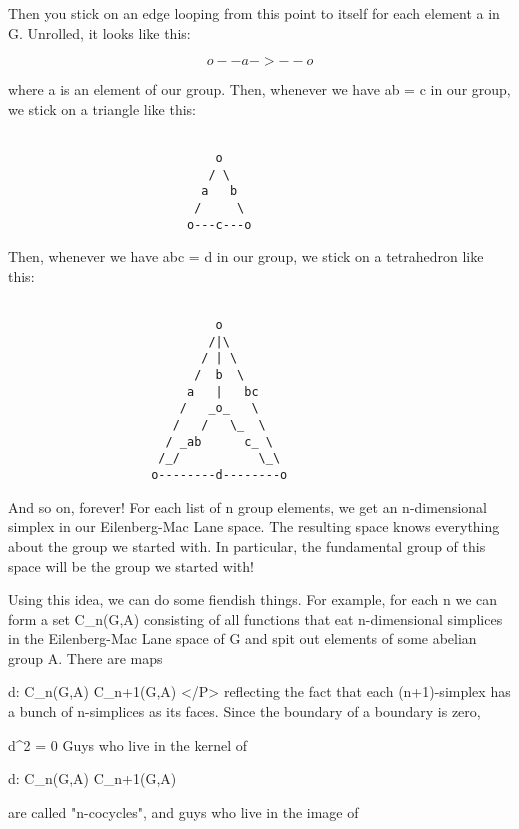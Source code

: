 Then you stick on an edge looping from this point to itself for
each element a in G.   Unrolled, it looks like this: 


$$

                         o--a->--o
$$
    
where a is an element of our group.  Then, whenever we have ab = c in 
our group, we stick on a triangle like this:


\begin{verbatim}

                             o
                            / \
                           a   b
                          /     \
                         o---c---o
\end{verbatim}
    
Then, whenever we have abc = d in our group, we stick on a tetrahedron 
like this:


\begin{verbatim}

                             o                      
                            /|\                    
                           / | \                  
                          /  b  \                
                         a   |   bc             
                        /   _o_   \  
                       /   /   \_  \          
                      / _ab      c_ \        
                     /_/           \_\      
                    o--------d--------o
\end{verbatim}
    

And so on, forever!  For each list of n group elements, we get an
n-dimensional simplex in our Eilenberg-Mac Lane space.  The resulting
space knows everything about the group we started with.  In particular, 
the fundamental group of this space will be the group we started with!

Using this idea, we can do some fiendish things.  For example, for each n 
we can form a set C_{n}(G,A) consisting of all functions that eat 
n-dimensional simplices in the Eilenberg-Mac Lane space of G and spit 
out elements of some abelian group A.  There are maps

d: C_{n}(G,A) \to  C_{n+1}(G,A)
</P>
reflecting the fact that each (n+1)-simplex has a bunch of n-simplices
as its faces.  Since the boundary of a boundary is zero, 

d^{2} = 0
Guys who live in the kernel of 

d: C_{n}(G,A) \to  C_{n+1}(G,A)

are called "n-cocycles", and guys who live in the image of

